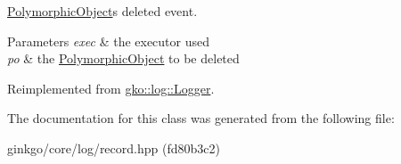\hyperlink{classgko_1_1PolymorphicObject}{Polymorphic\+Object}\textquotesingle{}s deleted event. 


\begin{DoxyParams}{Parameters}
{\em exec} & the executor used \\
\hline
{\em po} & the \hyperlink{classgko_1_1PolymorphicObject}{Polymorphic\+Object} to be deleted \\
\hline
\end{DoxyParams}


Reimplemented from \hyperlink{classgko_1_1log_1_1Logger}{gko\+::log\+::\+Logger}.



The documentation for this class was generated from the following file\+:\begin{DoxyCompactItemize}
\item 
ginkgo/core/log/record.\+hpp (fd80b3c2)\end{DoxyCompactItemize}
